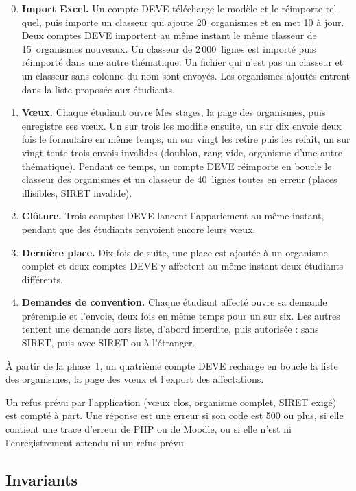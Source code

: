 \documentclass[11pt,a4paper]{article}
\begin{document}
\begin{enumerate}
  \setcounter{enumi}{-1}
  \item \textbf{Import Excel.} Un compte DEVE télécharge le modèle et le réimporte tel quel, puis
    importe un classeur qui ajoute 20~organismes et en met 10 à jour. Deux comptes DEVE importent
    au même instant le même classeur de 15~organismes nouveaux. Un classeur de 2\,000~lignes est
    importé puis réimporté dans une autre thématique. Un fichier qui n'est pas un classeur et un
    classeur sans colonne du nom sont envoyés. Les organismes ajoutés entrent dans la liste
    proposée aux étudiants.
  \item \textbf{Vœux.} Chaque étudiant ouvre \og Mes stages\fg{}, la page des organismes, puis
    enregistre ses vœux. Un sur trois les modifie ensuite, un sur dix envoie deux fois le
    formulaire en même temps, un sur vingt les retire puis les refait, un sur vingt tente trois
    envois invalides (doublon, rang vide, organisme d'une autre thématique). Pendant ce temps, un
    compte DEVE réimporte en boucle le classeur des organismes et un classeur de 40~lignes toutes
    en erreur (places illisibles, SIRET invalide).
  \item \textbf{Clôture.} Trois comptes DEVE lancent l'appariement au même instant, pendant que
    des étudiants renvoient encore leurs vœux.
  \item \textbf{Dernière place.} Dix fois de suite, une place est ajoutée à un organisme complet et
    deux comptes DEVE y affectent au même instant deux étudiants différents.
  \item \textbf{Demandes de convention.} Chaque étudiant affecté ouvre sa demande préremplie et
    l'envoie, deux fois en même temps pour un sur six. Les autres tentent une demande hors liste,
    d'abord interdite, puis autorisée : sans SIRET, puis avec SIRET ou à l'étranger.
\end{enumerate}

À partir de la phase~1, un quatrième compte DEVE recharge en boucle la liste des organismes, la
page des vœux et l'export des affectations.

Un refus prévu par l'application (vœux clos, organisme complet, SIRET exigé) est compté à part. Une
réponse est une erreur si son code est 500 ou plus, si elle contient une trace d'erreur de PHP ou
de Moodle, ou si elle n'est ni l'enregistrement attendu ni un refus prévu.

\subsection{Invariants}
\end{document}
